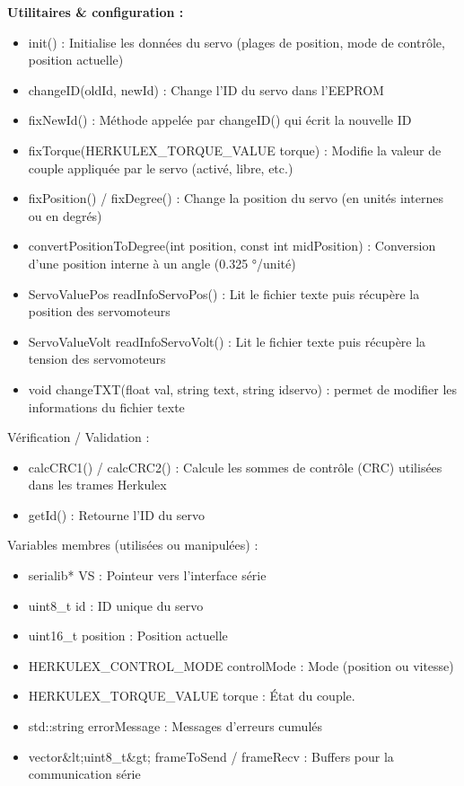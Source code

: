 \documentclass[main.tex]{subfiles}
\begin{document}
\textbf{Utilitaires \& configuration :}

\begin{itemize}
\item init() : Initialise les données du servo (plages de position, mode de contrôle, position actuelle)
\item changeID(oldId, newId) : Change l’ID du servo dans l’EEPROM
\item fixNewId() : Méthode appelée par changeID() qui écrit la nouvelle ID
\item fixTorque(HERKULEX\_TORQUE\_VALUE torque) : Modifie la valeur de couple appliquée par le servo (activé, libre, etc.)
\item fixPosition() / fixDegree() : Change la position du servo (en unités internes ou en degrés)
\item convertPositionToDegree(int position, const int midPosition) : Conversion d'une position interne à un angle (0.325 °/unité)
\item ServoValuePos readInfoServoPos() : Lit le fichier texte puis récupère la position des servomoteurs
\item ServoValueVolt readInfoServoVolt() : Lit le fichier texte puis récupère la tension des servomoteurs
\item void changeTXT(float val, string text, string idservo) : permet de modifier les informations du fichier texte
\end{itemize}

Vérification / Validation :

\begin{itemize}
\item calcCRC1() / calcCRC2() : Calcule les sommes de contrôle (CRC) utilisées dans les trames Herkulex
\item getId() : Retourne l’ID du servo
\end{itemize}

Variables membres (utilisées ou manipulées) :

\begin{itemize}
\item serialib* VS : Pointeur vers l’interface série
\item uint8\_t id : ID unique du servo
\item uint16\_t position : Position actuelle
\item HERKULEX\_CONTROL\_MODE controlMode : Mode (position ou vitesse)
\item HERKULEX\_TORQUE\_VALUE torque : État du couple.
\item std::string errorMessage : Messages d’erreurs cumulés
\item vector\&lt;uint8\_t\&gt; frameToSend / frameRecv : Buffers pour la communication série
\end{itemize}
\end{document}
